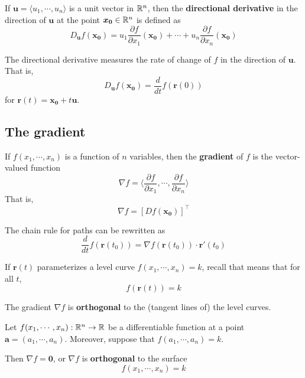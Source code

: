 \begin{definition}
    If $\bm{u} = \langle u_1, \cdots, u_n \rangle$ is a unit vector in $\mathbb{R}^n$, then the \textbf{directional derivative}
    in the direction of $\bm{u}$ at the point $\bm{x_0} \in \mathbb{R}^n$ is defined as
    $$D_{\bm{u}} f(\bm{x_0}) = u_1\frac{\partial f}{\partial x_1}(\bm{x_0}) + \cdots + u_n\frac{\partial f}{\partial x_n}(\bm{x_0})$$
    \end{definition}

The directional derivative measures the rate of change of $f$ in the direction of $\bm{u}$.  That is, $$D_{\bm{u}} f(\bm{x_0}) = \frac{d}{dt}f(\bm{r}(0))$$ for $\bm{r}(t) = \bm{x_0} + t\bm{u}$.


\begin{example}
    
\end{example}



\subsection{The gradient}


\begin{definition}
    If $f(x_1,\cdots,x_n)$ is a function of $n$ variables, then the \textbf{gradient} of $f$ is the vector-valued function 
    $$\nabla f = \langle \frac{\partial f}{\partial x_1} , \cdots, \frac{\partial f}{\partial x_n} \rangle$$
    That is, $$\nabla f = [Df(\bm{x_0})]^\top$$
    \end{definition}


    
    \begin{proposition}
    The chain rule for paths can be rewritten as
    $$\frac{d}{dt}f(\bm{r}(t_0))= \nabla f(\bm{r}(t_0)) \cdot \bm{r}'(t_0)$$
    
    \end{proposition}


If $\bm{r}(t)$ parameterizes a level curve $f(x_1, \cdots, x_n) =k$, recall that means that for all $t$, $$f(\bm{r}(t)) = k$$
    
    
    \begin{proposition}
    The gradient $\nabla f$ is \textbf{orthogonal} to the (tangent lines of) the level curves.
    \end{proposition}

\begin{corollary}
    Let $f(x_1,\cdots,x_n) : \mathbb{R}^n \to \mathbb{R}$ be a differentiable function at a point $\bm{a} = (a_1,\cdots, a_n)$.  Moreover, suppose that $f(a_1,\cdots,a_n) = k$.  
    
    Then $\nabla f = \bm{0}$, or $\nabla f$ is \textbf{orthogonal} to the surface $$f(x_1,\cdots,x_n) = k$$
    \end{corollary}


